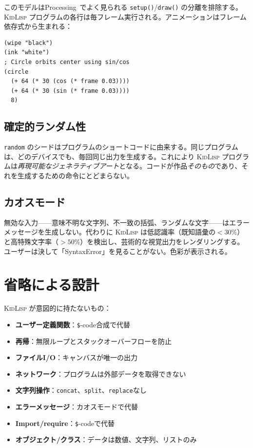 \documentclass[10pt,letterpaper,twocolumn]{article}
\newcommand{\kl}{\textsc{KidLisp}}
\begin{document}
このモデルはProcessing~\citep{reas2007processing}でよく見られる \texttt{setup()}/\texttt{draw()} の分離を排除する。\kl{} プログラムの各行は毎フレーム実行される。アニメーションはフレーム依存式から生まれる：

\begin{lstlisting}
(wipe "black")
(ink "white")
; Circle orbits center using sin/cos
(circle
  (+ 64 (* 30 (cos (* frame 0.03))))
  (+ 64 (* 30 (sin (* frame 0.03))))
  8)
\end{lstlisting}

\subsection{確定的ランダム性}

\texttt{random} のシードはプログラムのショートコードに由来する。同じプログラムは、どのデバイスでも、毎回同じ出力を生成する。これにより \kl{} プログラムは\emph{再現可能なジェネラティブアート}となる。コードが作品\emph{そのもの}であり、それを生成するための命令にとどまらない。

\subsection{カオスモード}

無効な入力——意味不明な文字列、不一致の括弧、ランダムな文字——はエラーメッセージを生成しない。代わりに \kl{} は低認識率（既知語彙の$<30\%$）と高特殊文字率（$>50\%$）を検出し、芸術的な視覚出力をレンダリングする。ユーザーは決して「SyntaxError」を見ることがない。色彩が表示される。

\section{省略による設計}

\kl{} が意図的に持たないもの：

\begin{itemize}
  \item \textbf{ユーザー定義関数}：\texttt{\$}-code合成で代替
  \item \textbf{再帰}：無限ループとスタックオーバーフローを防止
  \item \textbf{ファイルI/O}：キャンバスが唯一の出力
  \item \textbf{ネットワーク}：プログラムは外部データを取得できない
  \item \textbf{文字列操作}：\texttt{concat}、\texttt{split}、\texttt{replace}なし
  \item \textbf{エラーメッセージ}：カオスモードで代替
  \item \textbf{Import/require}：\texttt{\$}-codeで代替
  \item \textbf{オブジェクト/クラス}：データは数値、文字列、リストのみ
\end{itemize}
\end{document}
